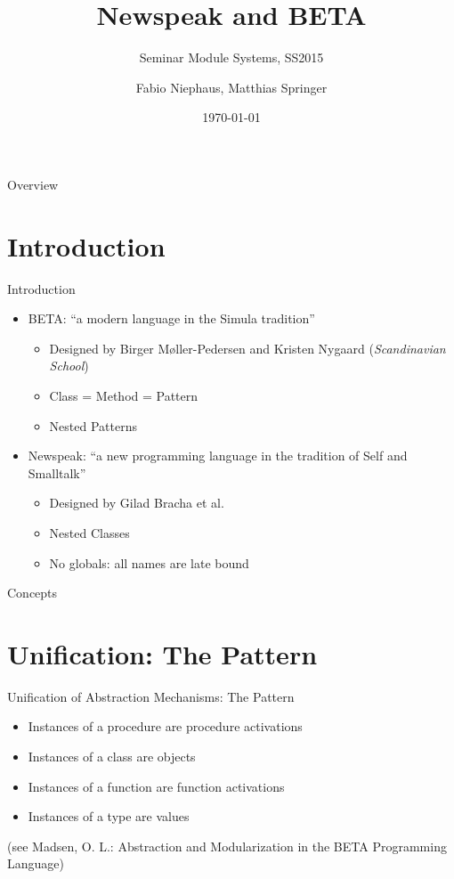 \documentclass[xcolor=dvipsname,handout]{beamer} %
\title{Newspeak and BETA}
\subtitle{Seminar Module Systems, SS2015}
\author{Fabio Niephaus, Matthias Springer}
\date{\today}
\institute[2012]{Hasso Plattner Institute, Software Architecture Group}
\begin{document}
\begin{frame}[plain]
	\maketitle
\end{frame}
\begin{frame}{Overview}
	\tableofcontents[hideallsubsections]
\end{frame}


\section{Introduction}

\begin{frame}{Introduction}
\begin{itemize}
    \item BETA: ``a modern language in the Simula tradition''
    \begin{itemize}
      \item Designed by Birger Møller-Pedersen and Kristen Nygaard (\emph{Scandinavian School})
      \item Class = Method = Pattern
      \item Nested Patterns
    \end{itemize}
    \item Newspeak: ``a new programming language in the tradition of Self and Smalltalk''
    \begin{itemize}
      \item Designed by Gilad Bracha et al.
      \item Nested Classes
      \item No globals: all names are late bound
    \end{itemize}
\end{itemize}
\end{frame}

\begin{frame}{Concepts}

\end{frame}

\section{Unification: The Pattern}

\begin{frame}{Unification of Abstraction Mechanisms: The Pattern}
\begin{itemize}
\item Instances of a procedure are procedure activations
\item Instances of a class are objects
\item Instances of a function are function activations
\item Instances of a type are values
\end{itemize}
\vfill
(see Madsen, O. L.: Abstraction and Modularization in the BETA Programming Language)
\end{frame}
\end{document}
